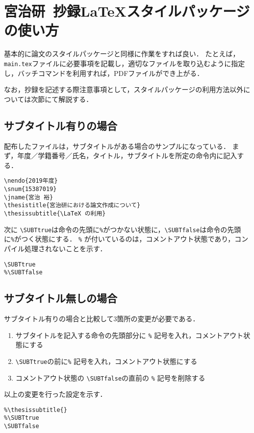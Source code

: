 \documentclass[a4paper,10pt,twocolumn]{jsarticle}
\begin{document}
\section{宮治研~抄録\LaTeX スタイルパッケージの使い方}
基本的に論文のスタイルパッケージと同様に作業をすれば良い．
たとえば，\verb+main.tex+ファイルに必要事項を記載し，適切なファイルを取り込むように指定し，バッチコマンドを利用すれば，PDFファイルができ上がる．

なお，抄録を記述する際注意事項として，スタイルパッケージの利用方法以外については次節にて解説する．

\subsection{サブタイトル有りの場合}
配布したファイルは，サブタイトルがある場合のサンプルになっている．
まず，年度／学籍番号／氏名，タイトル，サブタイトルを所定の命令内に記入する．
\begin{screen}
{\small
\begin{verbatim}
\nendo{2019年度}
\snum{15387019}
\jname{宮治 裕}
\thesistitle{宮治研における論文作成について}
\thesissubtitle{\LaTeX の利用}
\end{verbatim}
}
\end{screen}
次に \verb+\SUBTtrue+は命令の先頭に\verb+%+がつかない状態に，\verb+\SUBTfalse+は命令の先頭に\verb+%+がつく状態にする．
\verb+%+ が付いているのは，コメントアウト状態であり，コンパイル処理されないことを示す．
\begin{screen}
{\small
\begin{verbatim}
\SUBTtrue
%\SUBTfalse
\end{verbatim}
}
\end{screen}

\subsection{サブタイトル無しの場合}
サブタイトル有りの場合と比較して3箇所の変更が必要である．
\begin{enumerate}
\item サブタイトルを記入する命令の先頭部分に \verb+%+ 記号を入れ，コメントアウト状態にする
\item \verb+\SUBTtrue+の前に\verb+%+ 記号を入れ，コメントアウト状態にする
\item コメントアウト状態の \verb+\SUBTfalse+の直前の \verb+%+ 記号を削除する
\end{enumerate}
以上の変更を行った設定を示す．
\begin{screen}
{\small
\begin{verbatim}
%\thesissubtitle{}
%\SUBTtrue
\SUBTfalse
\end{verbatim}
}
\end{screen}

%
\end{document}
